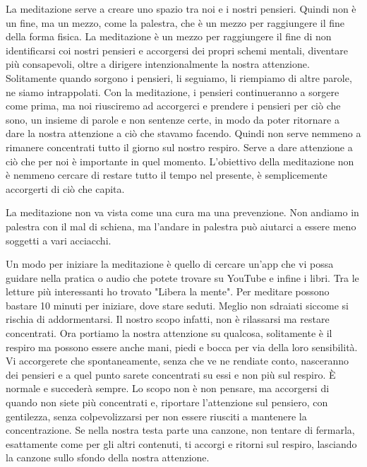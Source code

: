 \documentclass[12pt]{book} %
\begin{document}
La meditazione serve a creare uno spazio tra noi e i nostri pensieri. 
Quindi non è un fine, ma un mezzo, come la palestra, che è un mezzo per raggiungere il fine della forma fisica. La meditazione
è un mezzo per raggiungere il fine di non identificarsi coi nostri pensieri e accorgersi dei propri schemi mentali,
diventare più consapevoli, oltre a dirigere intenzionalmente la nostra attenzione. Solitamente quando sorgono i
pensieri, li seguiamo, li riempiamo di altre parole, ne siamo intrappolati. Con la
meditazione, i pensieri continueranno a sorgere come prima, ma noi riusciremo ad accorgerci e prendere i pensieri per
ciò che sono, un insieme di parole e non sentenze certe, in modo da poter ritornare a dare la nostra attenzione a ciò che
stavamo facendo. Quindi non serve nemmeno a rimanere concentrati tutto il giorno sul nostro respiro. 
Serve a dare attenzione a ciò che per noi è importante in quel momento. L'obiettivo della meditazione non è
nemmeno cercare di restare tutto il tempo nel presente, è semplicemente accorgerti di ciò che capita.

La meditazione non va vista come una cura ma una prevenzione. Non andiamo in palestra con il mal di schiena, ma l'andare in palestra può aiutarci a essere meno soggetti a vari acciacchi.

Un modo per iniziare la meditazione è quello di cercare un'app che vi possa guidare nella pratica o audio che potete trovare su YouTube e infine i libri. Tra le letture più interessanti ho trovato "Libera la mente". 
Per meditare possono bastare 10 minuti per iniziare, dove stare seduti. Meglio non sdraiati siccome si rischia di addormentarsi.
Il nostro scopo infatti, non è rilassarsi ma restare concentrati. Ora portiamo la nostra attenzione su qualcosa, solitamente è il respiro ma possono essere anche mani, piedi e bocca per via della loro sensibilità. 
Vi accorgerete che spontaneamente, senza che ve ne rendiate conto, nasceranno dei pensieri e a quel punto
sarete concentrati su essi e non più sul respiro. È normale e succederà sempre. Lo
scopo non è non pensare, ma accorgersi di quando non siete più concentrati e, riportare l'attenzione sul pensiero, con gentilezza, senza colpevolizzarsi per non essere riusciti a mantenere la concentrazione. Se nella nostra testa parte una canzone, non tentare di fermarla, esattamente come per gli altri contenuti, ti accorgi e ritorni sul respiro, lasciando la canzone sullo sfondo della nostra attenzione.
\end{document}
